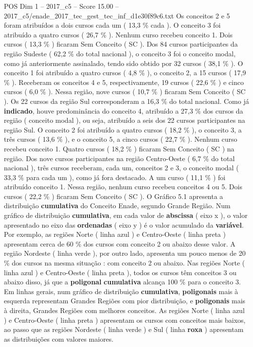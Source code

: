 \begin{textsample}{POS Dim 1 – 2017\_c5 – Score 15.00 – 2017\_c5/enade\_2017\_tec\_gest\_tec\_inf\_d1e30f89c6.txt}
Os conceitos 2 e 5 foram atribuídos a dois cursos cada um ( 13,3 \% cada ).
O conceito 3 foi atribuído a quatro cursos ( 26,7 \% ).
Nenhum curso recebeu conceito 1.
Dois cursos ( 13,3 \% ) ficaram Sem Conceito ( SC ).
Dos 84 cursos participantes da região Sudeste ( 62,2 \% do total nacional ), o conceito 3 foi o conceito modal, como já anteriormente assinalado, tendo sido obtido por 32 cursos ( 38,1 \% ).
O conceito 1 foi atribuído a quatro cursos ( 4,8 \% ), o conceito 2, a 15 cursos ( 17,9 \% ).
Receberam os conceitos 4 e 5, respectivamente, 19 cursos ( 22,6 \% ) e cinco cursos ( 6,0 \% ).
Nessa região, nove cursos ( 10,7 \% ) ficaram Sem Conceito ( SC ).
Os 22 cursos da região Sul corresponderam a 16,3 \% do total nacional.
Como já \textbf{indicado}, houve predominância do conceito 4, atribuído a 27,3 \% dos cursos da região ( conceito modal ), ou seja, atribuído a seis dos 22 cursos participantes na região Sul.
O conceito 2 foi atribuído a quatro cursos ( 18,2 \% ), o conceito 3, a três cursos ( 13,6 \% ), e o conceito 5, a cinco cursos ( 22,7 \% ).
Nenhum curso recebeu conceito 1.
Quatro cursos ( 18,2 \% ) ficaram Sem Conceito ( SC ) na região.
Dos nove cursos participantes na região Centro-Oeste ( 6,7 \% do total nacional ), três cursos receberam, cada um, conceitos 2 e 3, o conceito modal ( 33,3 \% para cada um ), como já fora destacado.
A um curso ( 11,1 \% ) foi atribuído conceito 1.
Nessa região, nenhum curso recebeu conceitos 4 ou 5.
Dois cursos ( 22,2 \% ) ficaram Sem Conceito ( SC ).
O Gráfico 5.1 apresenta a distribuição \textbf{cumulativa} do Conceito Enade, segundo Grande Região.
Num gráfico de distribuição \textbf{cumulativa}, em cada valor de \textbf{abscissa} ( eixo x ), o valor apresentado no eixo das \textbf{ordenadas} ( eixo y ) é o valor acumulado da \textbf{variável}.
Por exemplo, as regiões Norte ( linha azul ) e Centro-Oeste ( linha preta ) apresentam cerca de 60 \% dos cursos com conceito 2 ou abaixo desse valor.
A região Nordeste ( linha verde ), por outro lado, apresenta um pouco menos de 20 \% dos cursos na mesma situação : com conceito 2 ou abaixo.
Nas regiões Norte ( linha azul ) e Centro-Oeste ( linha preta ), todos os cursos têm conceitos 3 ou abaixo disso, já que a \textbf{poligonal} \textbf{cumulativa} alcança 100 \% para o conceito 3.
Em linhas gerais, num gráfico de distribuição \textbf{cumulativa}, \textbf{poligonais} mais à esquerda representam Grandes Regiões com pior distribuição, e \textbf{poligonais} mais à direita, Grandes Regiões com melhores conceitos.
As regiões Norte ( linha azul ) e Centro-Oeste ( linha preta ) apresentam os cursos com conceitos mais baixos, ao passo que as regiões Nordeste ( linha verde ) e Sul ( linha \textbf{roxa} ) apresentam as distribuições com valores maiores.

\end{textsample}
